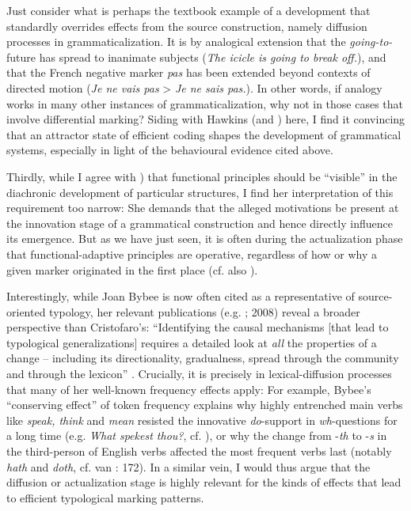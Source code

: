 \documentclass[output=paper]{langsci/langscibook}
\begin{document}
Just consider what is perhaps the textbook example of a development that standardly overrides effects from the source construction, namely diffusion processes in grammaticalization. It is by analogical extension that the \textit{going-to-}future has spread to inanimate subjects (\textit{The icicle is going to break off.}), and that the French negative marker \textit{pas} has been extended beyond contexts of directed motion (\textit{Je ne vais pas} > \textit{Je ne sais pas.}). In other words, if analogy works in many other instances of grammaticalization, why not in those cases that involve differential marking? Siding with Hawkins (and ) here, I find it convincing that an attractor state of efficient coding shapes the development of grammatical systems, especially in light of the behavioural evidence cited above.

Thirdly, while I agree with ) that functional principles should be “visible” in the diachronic development of particular structures, I find her interpretation of this requirement too narrow: She demands that the alleged motivations be present at the innovation stage of a grammatical construction and hence directly influence its emergence. But as we have just seen, it is often during the actualization phase that functional-adaptive principles are operative, regardless of how or why a given marker originated in the first place (cf. also ). 

Interestingly, while Joan Bybee is now often cited as a representative of source-oriented typology, her relevant publications (e.g. \citealt{Bybee1988}; 2008) reveal a broader perspective than Cristofaro’s: “Identifying the causal mechanisms [that lead to typological generalizations] requires a detailed look at \textit{all} the properties of a change – including its directionality, gradualness, spread through the community and through the lexicon” \citep[108]{Bybee2008}. Crucially, it is precisely in lexical-diffusion processes that many of her well-known frequency effects apply: For example, Bybee’s “conserving effect” of token frequency explains why highly entrenched main verbs like \textit{speak, think} and \textit{mean} resisted the innovative \textit{do}{}-support in \textit{wh}{}-questions for a long time (e.g. \textit{What spekest thou?}, cf. \citealt{Ogura1993}), or why the change from -\textit{th} to -\textit{s} in the third-person of English verbs affected the most frequent verbs last (notably \textit{hath} and \textit{doth}, cf. van \citealt{Gelderen2014}: 172). In a similar vein, I would thus argue that the diffusion or actualization stage is highly relevant for the kinds of effects that lead to efficient typological marking patterns. 
\end{document}
